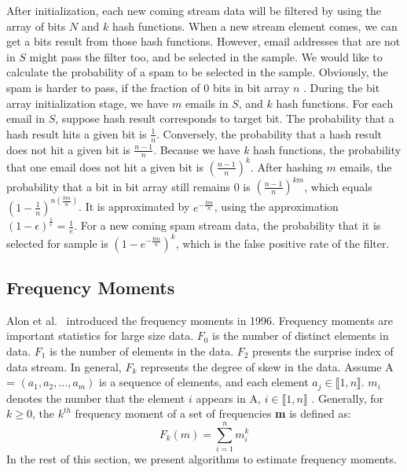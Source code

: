 After initialization, each new coming stream data will be filtered by using the
array of bits $N$ and $k$ hash functions. When a new stream element comes,
we can get a bits result from those hash functions.   However, email addresses that are not in $S$ might
pass the filter too, and be selected in the sample. We would like to calculate
the probability of a spam to be selected in the sample. Obviously, the spam
is harder to pass, if the fraction of 0 bits in bit array $n$ . During the bit array initialization stage, we have $m$ emails in
$S$, and $k$ hash functions. For each email in $S$, suppose hash result
corresponds to target bit. The probability that a hash result hits a given
bit is $\frac{1}{n}$. Conversely, the probability that a hash result does
not hit a given bit is $\frac{n-1}{n}$. Because we have $k$ hash functions,
the probability that
one email does not hit a given bit is $(\frac{n-1}{n})^k$. After hashing $m$ emails,
the probability that a bit in bit array still remains 0 is
$(\frac{n-1}{n})^{km}$, which equals $(1-\frac{1}{n})^{n(\frac{km}{n})}$. It
is approximated by $e^{-\frac{km}{n}}$, using the approximation
$(1-\epsilon)^\frac{1}{\epsilon} = \frac{1}{e}$. For a new coming spam stream
data, the probability that it is selected for sample is
$(1-e^{-\frac{km}{n}})^k$, which is the false positive rate of the filter.

\subsection{Frequency Moments}

Alon et al.~\cite{alon1999space} introduced the frequency moments in 1996.
Frequency moments are important statistics for large size data. $F_0$ is
the number of distinct elements in data. $F_1$ is the number of elements in
the data. $F_2$ presents the surprise index of data stream. In general,
$F_k$ represents the degree of skew in the data. Assume A =
$(a_1,a_2,...,a_m)$ is a sequence of elements, and each element $a_j \in
\llbracket1, n\rrbracket$. $m_i$ denotes the number that the element $i$
appears in A, $i \in \llbracket1, n\rrbracket$ .
Generally, for $k\geqslant0$, the $k^{th}$ frequency moment of a set of
frequencies \textbf{m}  is defined as: 
\begin{equation*}
F_k(m) = \sum_{i=1}^n m_i^k     
\end{equation*}
In the rest of this section, we present algorithms to estimate frequency moments. 

